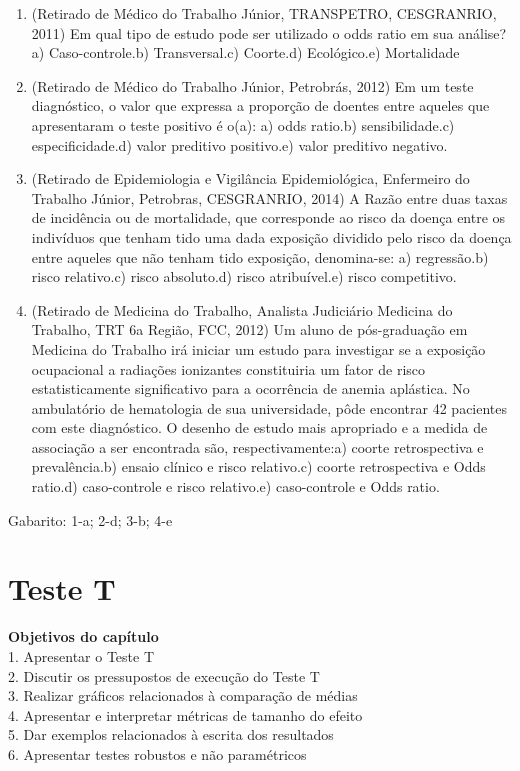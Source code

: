 \documentclass[
]{book}
\newenvironment{objectives}{
  \definecolor{shadecolor}{rgb}{0.764,0.992,0.686}  %
  \color{black}
  \begin{shaded}}
 {\end{shaded}}
\begin{document}
\begin{enumerate}
\def\labelenumi{\arabic{enumi}.}
\item
  (Retirado de Médico do Trabalho Júnior, TRANSPETRO, CESGRANRIO, 2011) Em qual tipo de estudo pode ser utilizado o odds ratio em sua análise?a) Caso-controle.b) Transversal.c) Coorte.d) Ecológico.e) Mortalidade
\item
  (Retirado de Médico do Trabalho Júnior, Petrobrás, 2012) Em um teste diagnóstico, o valor que expressa a proporção de doentes entre aqueles que apresentaram o teste positivo é o(a): a) odds ratio.b) sensibilidade.c) especificidade.d) valor preditivo positivo.e) valor preditivo negativo.
\item
  (Retirado de Epidemiologia e Vigilância Epidemiológica, Enfermeiro do Trabalho Júnior, Petrobras, CESGRANRIO, 2014) A Razão entre duas taxas de incidência ou de mortalidade, que corresponde ao risco da doença entre os indivíduos que tenham tido uma dada exposição dividido pelo risco da doença entre aqueles que não tenham tido exposição, denomina-se: a) regressão.b) risco relativo.c) risco absoluto.d) risco atribuível.e) risco competitivo.
\item
  (Retirado de Medicina do Trabalho, Analista Judiciário Medicina do Trabalho, TRT 6a Região, FCC, 2012) Um aluno de pós-graduação em Medicina do Trabalho irá iniciar um estudo para investigar se a exposição ocupacional a radiações ionizantes constituiria um fator de risco estatisticamente significativo para a ocorrência de anemia aplástica. No ambulatório de hematologia de sua universidade, pôde encontrar 42 pacientes com este diagnóstico. O desenho de estudo mais apropriado e a medida de associação a ser encontrada são, respectivamente:a) coorte retrospectiva e prevalência.b) ensaio clínico e risco relativo.c) coorte retrospectiva e Odds ratio.d) caso-controle e risco relativo.e) caso-controle e Odds ratio.
\end{enumerate}

Gabarito: 1-a; 2-d; 3-b; 4-e

\hypertarget{teste-t}{%
\chapter{Teste T}\label{teste-t}}

\begin{objectives}
\textbf{Objetivos do capítulo}\\
1. Apresentar o Teste T\\
2. Discutir os pressupostos de execução do Teste T\\
3. Realizar gráficos relacionados à comparação de médias\\
4. Apresentar e interpretar métricas de tamanho do efeito\\
5. Dar exemplos relacionados à escrita dos resultados\\
6. Apresentar testes robustos e não paramétricos

\end{objectives}
\end{document}

